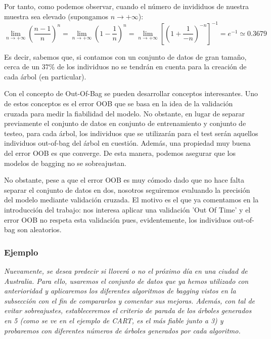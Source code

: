\documentclass[12pt,twoside]{article}
\begin{document}
Por tanto, como podemos observar, cuando el número de invididuos de nuestra muestra sea elevado (supongamos $n \rightarrow +\infty$):
\begin{equation*}
\lim_{n \rightarrow + \infty} \left( \frac{n-1}{n} \right)^n = \lim_{n \rightarrow +\infty} \left( 1 - \frac{1}{n} \right)^n = \lim_{n \rightarrow +\infty} \left[ \left( 1 + \frac{1}{-n} \right)^{-n} \right] ^{-1} = e^{-1} \simeq 0.3679
\end{equation*}

Es decir, sabemos que, si contamos con un conjunto de datos de gran tamaño, cerca de un $37 \%$ de los individuos no se tendrán en cuenta para la creación de cada árbol (en particular).

Con el concepto de Out-Of-Bag se pueden desarrollar conceptos interesantes. Uno de estos conceptos es el error OOB que se basa en la idea de la validación cruzada para medir la fiabilidad del modelo. No obstante, en lugar de separar previamente el conjunto de datos en conjunto de entrenamiento y conjunto de testeo, para cada árbol, los individuos que se utilizarán para el test serán aquellos individuos out-of-bag del árbol en cuestión. Además, una propiedad muy buena del error OOB es que converge. De esta manera, podemos asegurar que los modelos de bagging no se sobreajustan.

No obstante, pese a que el error OOB es muy cómodo dado que no hace falta separar el conjunto de datos en dos, nosotros seguiremos evaluando la precisión del modelo mediante validación cruzada. El motivo es el que ya comentamos en la introducción del trabajo: nos interesa aplicar una validación 'Out Of Time' y el error OOB no respeta esta validación pues, evidentemente, los individuos out-of-bag son aleatorios.


\subsubsection{Ejemplo}
\textit{Nuevamente, se desea predecir si lloverá o no el próximo día en una ciudad de Australia. Para ello, usaremos el conjunto de datos que ya hemos utilizado con anterioridad y aplicaremos los diferentes algoritmos de bagging vistos en la subsección con el fin de compararlos y comentar sus mejoras. Además, con tal de evitar sobreajustes, estableceremos el criterio de parada de los árboles generados en 5 (como se ve en el ejemplo de CART, es el más fiable junto a 3) y probaremos con diferentes números de árboles generados por cada algoritmo.}
\end{document}
